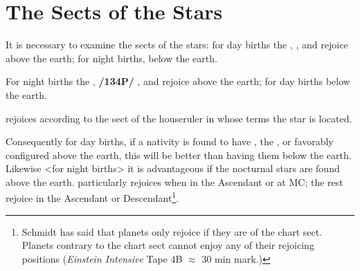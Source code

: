 \section{The Sects of the Stars}
It is necessary to examine the sects of the stars: for day births the \Sun, \Jupiter, and \Saturn\xspace rejoice above the earth; for night births, below the earth. 

For night births the \Moon, \textbf{/134P/} \Mars, and \Venus\xspace rejoice above the earth; for day births below the earth. 

\Mercury\xspace rejoices according to the sect of the houseruler in whose terms the star is located. 

Consequently for day births, if a nativity is found to have \Jupiter, the \Sun, or \Saturn favorably configured above the earth, this will be better than having them below the earth.
Likewise <for night births> it is advantageous if the nocturnal stars are found above the earth. \Venus\xspace
particularly rejoices when in the Ascendant or at MC; the rest rejoice in the Ascendant or Descendant\footnote{Schmidt has said that planets only rejoice if they are of the chart sect. Planets contrary to the chart sect cannot enjoy any of their rejoicing positions (\textsl{Einstein Intensive} Tape 4B $\approx$ 30 min mark.)}.

\newpage